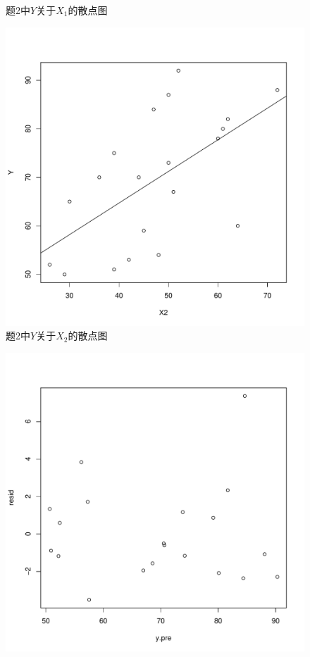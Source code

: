 \begin{enumerate}
\begin{figure}[H]
            \caption{题2中$Y$关于$X_1$的散点图}
        \end{figure}
        \begin{figure}[H]
            \centering
            \includegraphics[scale=0.6]{4.2散点图Y-X2.pdf}
            \caption{题2中$Y$关于$X_2$的散点图}
        \end{figure}
        \begin{figure}[H]
            \centering
            \includegraphics[scale=0.6]{4.2残差图.pdf}

\end{figure}
\end{enumerate}

